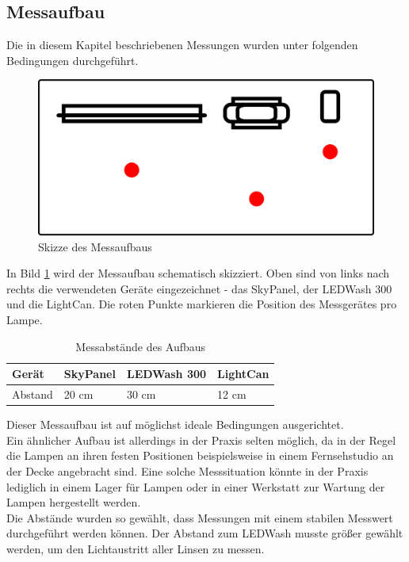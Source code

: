 \documentclass[11pt]{scrartcl}
\begin{document}
\subsection{Messaufbau}
Die in diesem Kapitel beschriebenen Messungen wurden unter folgenden Bedingungen durchgeführt.
\begin{figure}[H]
    \begin{center}
        \includegraphics[width=.8\textwidth]{images/meassureScenario.png}
    \end{center}
    \caption{Skizze des Messaufbaus} \label{fig:measureScribble}
\end{figure}
\noindent
In Bild \ref{fig:measureScribble} wird der Messaufbau schematisch skizziert. Oben sind von links nach rechts die verwendeten Geräte eingezeichnet -
das SkyPanel, der LEDWash 300 und die LightCan. Die roten Punkte markieren die Position des Messgerätes pro Lampe.
\begin{table}[H]
    \begin{tabularx}{\textwidth}{|l|X|X|X|}
        \hline Gerät  & SkyPanel & LEDWash 300 & LightCan\\\hline
        Abstand       & 20 cm    & 30 cm       & 12 cm   \\\hline
    \end{tabularx}
    \caption{Messabstände des Aufbaus}
\end{table}
\noindent
Dieser Messaufbau ist auf möglichst ideale Bedingungen ausgerichtet.\\
Ein ähnlicher Aufbau ist allerdings in der Praxis selten möglich, da in der Regel die Lampen an ihren festen Positionen beispielsweise in einem
Fernsehstudio an der Decke angebracht sind. Eine solche Messsituation könnte in der Praxis lediglich in einem Lager für Lampen oder in einer
Werkstatt zur Wartung der Lampen hergestellt werden.\\
Die Abstände wurden so gewählt, dass Messungen mit einem stabilen Messwert durchgeführt werden können. Der Abstand zum LEDWash musste größer
gewählt werden, um den Lichtaustritt aller Linsen zu messen.\\
\end{document}
